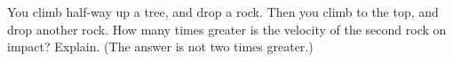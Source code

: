  You climb half-way up a tree, and drop a rock. Then you
climb to the top, and drop another rock. How many times
greater is the velocity of the second rock on impact?
Explain. (The answer is not two times greater.)
